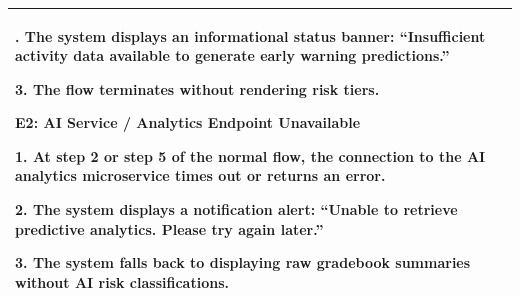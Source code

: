{\begin{longtable}{|>{\bfseries\raggedright\arraybackslash}p{}|>{\raggedright\arraybackslash}p{}|}
2. The system displays an informational status banner: ``Insufficient activity data available to generate early warning predictions.'' \par
3. The flow terminates without rendering risk tiers. \par\vspace{4pt}
\textbf{E2: AI Service / Analytics Endpoint Unavailable} \par
1. At step 2 or step 5 of the normal flow, the connection to the AI analytics microservice times out or returns an error. \par
2. The system displays a notification alert: ``Unable to retrieve predictive analytics. Please try again later.'' \par
3. The system falls back to displaying raw gradebook summaries without AI risk classifications. \\ \hline
\end{longtable}
}